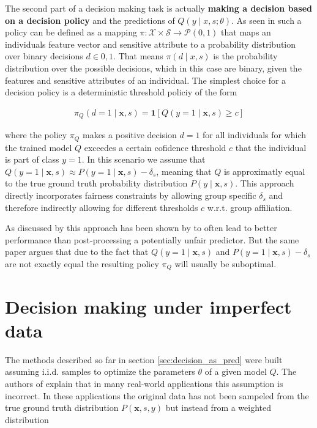 \documentclass[
	a4paper,
	11pt
	]{article}
\begin{document}
The second part of a decision making task is actually \textbf{making a decision based on a decision policy} and the predictions of $Q(y \mid x, s; \theta)$. As seen in \cite{Kilbertus19} such a policy can be defined as a mapping $\pi: \mathcal{X} \times \mathcal{S} \rightarrow \mathcal{P}({0,1})$ that maps an individuals feature vector and sensitive attribute to a probability distribution over binary decisions $d \in {0, 1}$. That means $\pi(d \mid x, s)$ is the probability distribution over the possible decisions, which in this case are binary, given the features and sensitive attributes of an individual. The simplest choice for a decision policy is a deterministic threshold policiy of the form

\begin{align*}
    \pi_{Q}(d = 1 \mid \boldsymbol{x}, s) = \boldsymbol{1}[Q(y = 1 \mid \boldsymbol{x}, s) \geq c]
\end{align*}

where the policy $\pi_{Q}$ makes a positive decision $d = 1$ for all individuals for which the trained model $Q$ exceedes a certain cofidence threshold $c$ that the individual is part of class $y = 1$. In this scenario we assume that $Q(y = 1 \mid \boldsymbol{x}, s) \approx P(y = 1 \mid \boldsymbol{x}, s) - \delta_s$, meaning that $Q$ is approximatly equal to the true ground truth probability distribution $P(y \mid \boldsymbol{x}, s)$. This approach directly incorporates fairness constraints by allowing group specific $\delta_s$ and therefore indirectly allowing for different thresholds $c$ w.r.t. group affiliation.

As discussed by \cite{Kilbertus19} this approach has been shown by \cite{Woodworth17} to often lead to better performance than post-processing a potentially unfair predictor. But the same paper argues that due to the fact that $Q(y = 1 \mid \boldsymbol{x}, s)$ and $P(y = 1 \mid \boldsymbol{x}, s) - \delta_s$ are not exactly equal the resulting policy $\pi_{Q}$ will usually be suboptimal.

\section{Decision making under imperfect data}
\label{sec:dec_under_imp_data}
The methods described so far in section \ref{sec:decision_as_pred} were built assuming i.i.d. samples to optimize the parameters $\theta$ of a given model $Q$. The authors of \cite{Kilbertus19} explain that in many real-world applications this assumption is incorrect. In these applications the original data has not been sampeled from the true ground truth distribution $P(\boldsymbol{x}, s, y)$ but instead from a weighted distribution 
\end{document}
